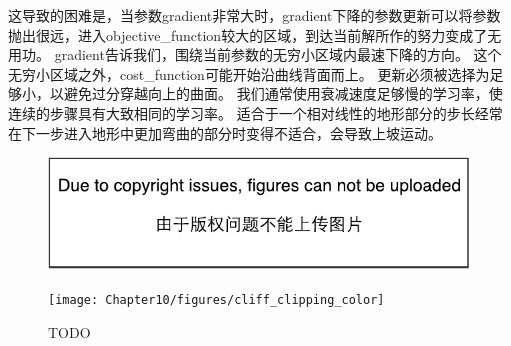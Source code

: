这导致的困难是，当参数\gls{gradient}非常大时，\gls{gradient}下降的参数更新可以将参数抛出很远，进入\gls{objective_function}较大的区域，到达当前解所作的努力变成了无用功。
\gls{gradient}告诉我们，围绕当前参数的无穷小区域内最速下降的方向。
这个无穷小区域之外，\gls{cost_function}可能开始沿曲线背面而上。
更新必须被选择为足够小，以避免过分穿越向上的曲面。
我们通常使用衰减速度足够慢的学习率，使连续的步骤具有大致相同的学习率。
适合于一个相对线性的地形部分的步长经常在下一步进入地形中更加弯曲的部分时变得不适合，会导致上坡运动。

\begin{figure}[!htb]
\ifOpenSource
\centerline{\includegraphics{figure.pdf}}
\else
\centerline{\texttt{[image: Chapter10/figures/cliff\_clipping\_color]}}
\fi
\caption{TODO}
\label{fig:chap10_cliff_clipping_color}
\end{figure}


